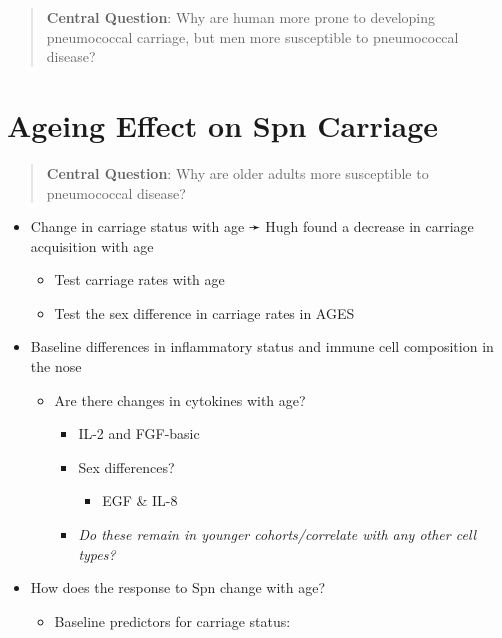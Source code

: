 \documentclass[
]{book}
\providecommand{\tightlist}{%
  \setlength{\itemsep}{0pt}\setlength{\parskip}{0pt}}
\begin{document}
\begin{quote}
\textbf{Central Question}: Why are human more prone to developing pneumococcal carriage, but men more susceptible to pneumococcal disease?
\end{quote}

\hypertarget{ageing-effect-on-spn-carriage}{%
\section{Ageing Effect on Spn Carriage}\label{ageing-effect-on-spn-carriage}}

\begin{quote}
\textbf{Central Question}: Why are older adults more susceptible to pneumococcal disease?
\end{quote}

\begin{itemize}
\item
  Change in carriage status with age ➛ Hugh found a decrease in carriage acquisition with age

  \begin{itemize}
  \item
    Test carriage rates with age
  \item
    Test the sex difference in carriage rates in AGES
  \end{itemize}
\item
  Baseline differences in inflammatory status and immune cell composition in the nose

  \begin{itemize}
  \item
    Are there changes in cytokines with age?

    \begin{itemize}
    \item
      IL-2 and FGF-basic
    \item
      Sex differences?

      \begin{itemize}
      \tightlist
      \item
        EGF \& IL-8
      \end{itemize}
    \item
      \emph{Do these remain in younger cohorts/correlate with any other cell types?}
    \end{itemize}
  \end{itemize}
\item
  How does the response to Spn change with age?

  \begin{itemize}
  \item
    Baseline predictors for carriage status:


\end{itemize}
\end{itemize}
\end{document}
